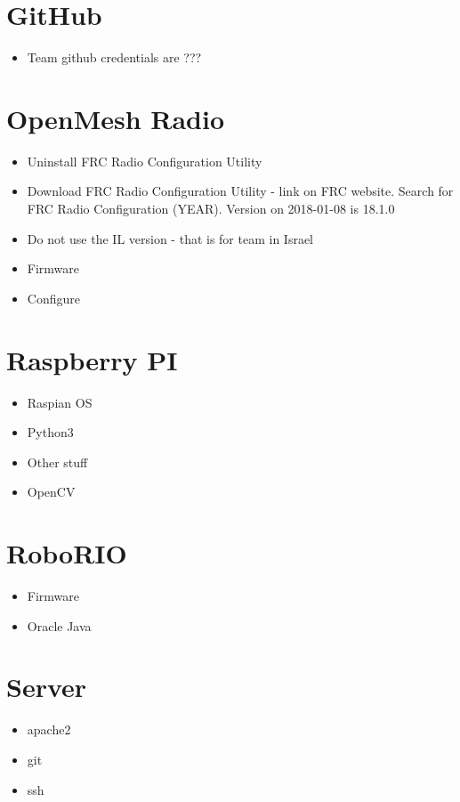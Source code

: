 \section*{GitHub}
\begin{itemize}
\item Team github credentials are ???
\end{itemize}


\section*{OpenMesh Radio}
\begin{itemize}
\item Uninstall FRC Radio Configuration Utility
\item Download FRC Radio Configuration Utility - link on FRC website. Search for FRC Radio Configuration (YEAR). Version on 2018-01-08 is 18.1.0
\item Do not use the IL version - that is for team in Israel


\item Firmware
\item Configure
\end{itemize}


\section*{Raspberry PI}
\begin{itemize}
\item Raspian OS
\item Python3
\item Other stuff
\item OpenCV
\end{itemize}


\section*{RoboRIO}
\begin{itemize}
\item Firmware
\item Oracle Java
\end{itemize}


\section*{Server}
\begin{itemize}
\item apache2
\item git
\item ssh
\end{itemize}




